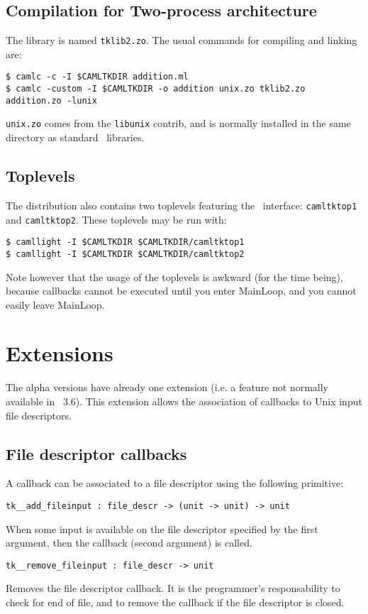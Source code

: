 \subsection{Compilation for Two-process architecture}
The library is named \verb|tklib2.zo|.
The usual commands for compiling and linking are:
\begin{verbatim}
$ camlc -c -I $CAMLTKDIR addition.ml
$ camlc -custom -I $CAMLTKDIR -o addition unix.zo tklib2.zo addition.zo -lunix
\end{verbatim} 
 \verb|unix.zo| comes from the
\verb|libunix| contrib, and is normally installed in the same directory as
standard \caml\ libraries. 

\subsection{Toplevels}
The distribution also contains two toplevels featuring the \caml\tk\
interface: \verb|camltktop1| and \verb|camltktop2|.
These toplevels may be run with: 
\begin{verbatim}
$ camllight -I $CAMLTKDIR $CAMLTKDIR/camltktop1
$ camllight -I $CAMLTKDIR $CAMLTKDIR/camltktop2
\end{verbatim} 
Note however that the usage of the toplevels is awkward (for the time
being), because callbacks cannot be executed until you enter MainLoop, and
you cannot easily leave MainLoop.

\section{Extensions}
The alpha versions have already one extension (i.e. a feature not
normally available in \tk\ 3.6). This extension allows the association of
callbacks to Unix input file descriptors. 

\subsection{File descriptor callbacks}
A callback can be associated to a file descriptor using the following
primitive:
\begin{verbatim}
tk__add_fileinput : file_descr -> (unit -> unit) -> unit
\end{verbatim} 
When some input is available on the file descriptor specified by the first
argument, then the callback (second argument) is called.
\begin{verbatim}
tk__remove_fileinput : file_descr -> unit
\end{verbatim} 
Removes the file descriptor callback. It is the programmer's responsability
to check for end of file, and to remove the callback if the file descriptor
is closed.

